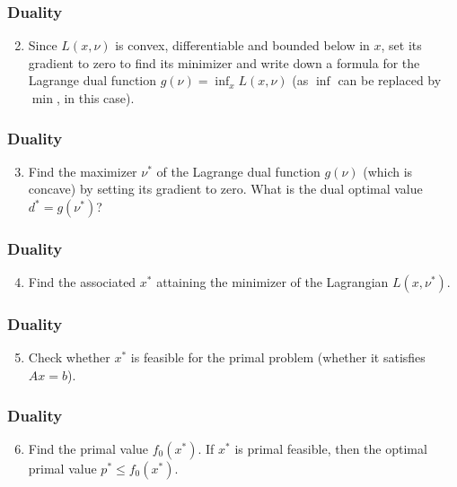 \documentclass{beamer}
\begin{document}
\begin{frame}[t] 
\frametitle{Duality}
\vspace{-5pt}
\begin{enumerate}
\setcounter{enumi}{1}
\item Since $L(x,\nu)$ is convex, differentiable and bounded below in $x$, set its gradient to zero to find its minimizer and write down a formula for the Lagrange dual function $g(\nu) = \inf_x L(x,\nu)$ (as $\inf$ can be replaced by $\min$, in this case).
\end{enumerate}
\end{frame}

\begin{frame}[t] 
\frametitle{Duality}
\vspace{-5pt}
\begin{enumerate}
\setcounter{enumi}{2}
\item Find the maximizer $\nu^*$ of the Lagrange dual function $g(\nu)$ (which is concave) by setting its
gradient to zero. What is the dual optimal value $d^* = g(\nu^*)$?
\end{enumerate}
\pause
\pause
\end{frame}

\begin{frame}[t] 
\frametitle{Duality}
\vspace{-5pt}
\begin{enumerate}
\setcounter{enumi}{3}
\item Find the associated $x^*$ attaining the minimizer of the Lagrangian $L(x, \nu^*)$.
\end{enumerate}
\end{frame}

\begin{frame}[t] 
\frametitle{Duality}
\vspace{-5pt}
\begin{enumerate}
\setcounter{enumi}{4}
\item Check whether $x^*$ is feasible for the primal problem (whether it satisfies $Ax = b$).
\end{enumerate}
\end{frame}

\begin{frame}[t] 
\frametitle{Duality}
\vspace{-5pt}
\begin{enumerate}
\setcounter{enumi}{5}
\item Find the primal value $f_0(x^*)$. If $x^*$ is primal feasible, then the optimal primal value $p^* \leq f_0(x^*)$.
\end{enumerate}
\end{frame}
\end{document}
